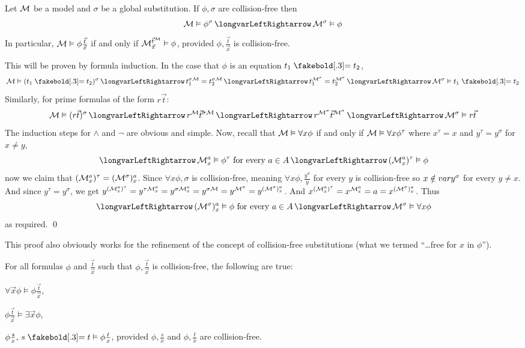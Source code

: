 \bthrm[title=The Substitution Theorem, name=substitutiontheorem]

    Let ${\cal M}$ be a model and $\sigma$ be a global substitution.
    If $\phi,\sigma$ are collision-free then
    $$ {\cal M}\vDash\phi^\sigma \iff {\cal M}^\sigma\vDash\phi $$
    In particular, ${\cal M}\vDash\phi\frac{\vec t}{\vec x}$ if and only if ${\cal M}^{\vec t^{\cal M}}_{\vec x}\vDash\phi$, provided $\phi,\frac{\vec t}{\vec x}$ is collision-free.

\ethrm

This will be proven by formula induction.
In the case that $\phi$ is an equation $t_1\eq t_2$,
$$ {\cal M}\vDash(t_1\eq t_2)^\sigma \iff t_1^{\sigma\cal M} = t_2^{\sigma\cal M} \iff t_1^{\cal M^\sigma} = t_2^{\cal M^\sigma} \iff {\cal M}^\sigma\vDash t_1\eq t_2 $$
Similarly, for prime formulas of the form $r\vec t$:
$$ {\cal M}\vDash (r\vec t)^\sigma \iff r^{\cal M}\vec t^{\sigma\cal M} \iff r^{\cal M^\sigma}\vec t^{\cal M^\sigma} \iff {\cal M}^\sigma\vDash r\vec t $$
The induction steps for $\land$ and $\neg$ are obvious and simple.
Now, recall that ${\cal M}\vDash\forall x\phi$ if and only if ${\cal M}\vDash\forall x\phi^\tau$ where $x^\tau=x$ and $y^\tau=y^\sigma$ for $x\neq y$,
$$ \iff {\cal M}^a_x\vDash\phi^\tau \hbox{ for every $a\in A$} \iff ({\cal M}^a_x)^\tau \vDash \phi $$
now we claim that $({\cal M}^a_x)^\tau=({\cal M}^\sigma)^a_x$.
Since $\forall x\phi,\sigma$ is collision-free, meaning $\forall x\phi,\frac{y^\sigma}y$ for every $y$ is collision-free so $x\notin{\sl var} y^\sigma$ for every $y\neq x$.
And since $y^\tau=y^\sigma$, we get $y^{({\cal M}^a_x)^\tau}=y^{\tau{\cal M}^a_x}=y^{\sigma{\cal M}^a_x}=y^{\sigma\cal M}=y^{\cal M^\sigma}=y^{({\cal M}^\sigma)^a_x}$.
And $x^{({\cal M}^a_x)^\tau} = x^{{\cal M}^a_x} = a = x^{({\cal M^\sigma})^a_x}$.
Thus
$$ \iff ({\cal M}^\sigma)^a_x\vDash\phi \hbox{ for every $a\in A$} \iff {\cal M}^\sigma\vDash\forall x\phi $$
as required.
\qed

This proof also obviously works for the refinement of the concept of collision-free substitutions (what we termed ``\dots free for $x$ in $\phi$'').

\bcoro[name=universaltosubstitution]

    For all formulas $\phi$ and $\frac{\vec t}{\vec x}$ such that $\phi,\frac{\vec t}{\vec x}$ is collision-free, the following are true:
    \benum
        \item $\forall\vec x\phi\vDash\phi\frac{\vec t}{\vec x}$,
        \item $\phi\frac{\vec t}{\vec x}\vDash\exists\vec x\phi$,
        \item $\phi\frac sx,\,s\eq t\vDash\phi\frac tx$, provided $\phi,\frac sx$ and $\phi,\frac tx$ are collision-free.
    \eenum


